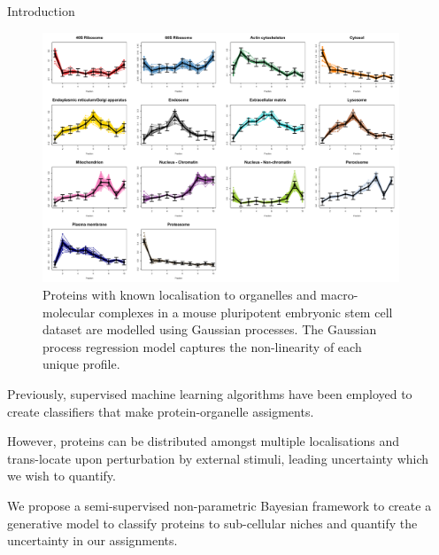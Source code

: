 \documentclass[final, 10pt]{beamer}
\newlength{\sepwid}
\newlength{\onecolwid}
\begin{document}
\begin{frame}[t]
\begin{columns}[t]
\begin{column}{\onecolwid}
\begin{block}{Introduction}

  \begin{figure}
    \includegraphics[width=1\linewidth]{GPallprofiles}
    \caption{ Proteins with known localisation to organelles and macro-molecular complexes in a mouse pluripotent embryonic stem cell dataset are modelled using Gaussian processes. The Gaussian process regression model captures the non-linearity of each unique profile.}
  \end{figure}

  \begin{itemize}
  \small{\item Previously, supervised machine learning algorithms have been employed to create classifiers that make protein-organelle assigments. 
  \item However, proteins can be distributed amongst multiple localisations and trans-locate upon perturbation by external stimuli,
  leading uncertainty which we wish to quantify.
  \item We propose a semi-supervised non-parametric Bayesian framework to create a generative model to classify proteins to sub-cellular niches and quantify the uncertainty in our assignments.}
  \end{itemize}

\end{block}



\end{column} %

\begin{column}{\sepwid}\end{column} %


\end{columns}
\end{frame}
\end{document}
